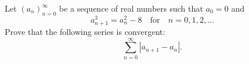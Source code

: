 Let $(a_n)_{n=0}^{\infty}$ be a sequence of real numbers such that $a_0=0$ and
$$a_{n+1}^3=a_n^2-8\quad \text{for} \quad n=0,1,2,…$$Prove that the following series is convergent:
$$\sum_{n=0}^{\infty}{|a_{n+1}-a_n|}.$$

